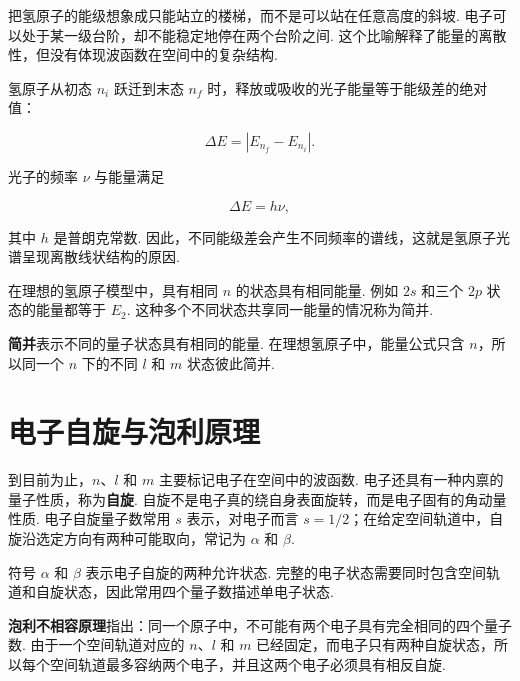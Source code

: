 \documentclass[UTF8,11pt,a4paper,openany]{ctexbook}
\newcommand{\term}[1]{\textbf{#1}}
\begin{document}
\begin{analogybox}
把氢原子的能级想象成只能站立的楼梯，而不是可以站在任意高度的斜坡. 电子可以处于某一级台阶，却不能稳定地停在两个台阶之间. 这个比喻解释了能量的离散性，但没有体现波函数在空间中的复杂结构. 
\end{analogybox}

\begin{derivationbox}
氢原子从初态 $n_i$ 跃迁到末态 $n_f$ 时，释放或吸收的光子能量等于能级差的绝对值：

\[
\Delta E=\left|E_{n_f}-E_{n_i}\right|.
\]

光子的频率 $\nu$ 与能量满足

\[
\Delta E=h\nu,
\]

其中 $h$ 是普朗克常数. 因此，不同能级差会产生不同频率的谱线，这就是氢原子光谱呈现离散线状结构的原因. 
\end{derivationbox}

在理想的氢原子模型中，具有相同 $n$ 的状态具有相同能量. 例如 $2s$ 和三个 $2p$ 状态的能量都等于 $E_2$. 这种多个不同状态共享同一能量的情况称为简并. 

\begin{notationbox}
\term{简并}表示不同的量子状态具有相同的能量. 在理想氢原子中，能量公式只含 $n$，所以同一个 $n$ 下的不同 $l$ 和 $m$ 状态彼此简并. 
\end{notationbox}

\section{电子自旋与泡利原理}

到目前为止，$n$、$l$ 和 $m$ 主要标记电子在空间中的波函数. 电子还具有一种内禀的量子性质，称为\term{自旋}. 自旋不是电子真的绕自身表面旋转，而是电子固有的角动量性质. 电子自旋量子数常用 $s$ 表示，对电子而言 $s=1/2$；在给定空间轨道中，自旋沿选定方向有两种可能取向，常记为 $\alpha$ 和 $\beta$. 

\begin{notationbox}
符号 $\alpha$ 和 $\beta$ 表示电子自旋的两种允许状态. 完整的电子状态需要同时包含空间轨道和自旋状态，因此常用四个量子数描述单电子状态. 
\end{notationbox}

\begin{definitionbox}
\term{泡利不相容原理}指出：同一个原子中，不可能有两个电子具有完全相同的四个量子数. 由于一个空间轨道对应的 $n$、$l$ 和 $m$ 已经固定，而电子只有两种自旋状态，所以每个空间轨道最多容纳两个电子，并且这两个电子必须具有相反自旋. 
\end{definitionbox}
\end{document}
